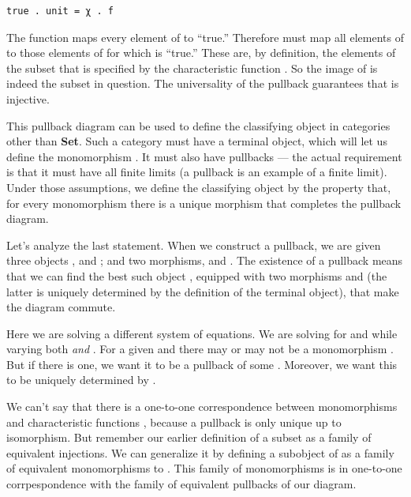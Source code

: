 \begin{Verbatim}[commandchars=\\\{\}]
true . unit = χ . f
\end{Verbatim}

The function  maps every element of  to
``true.'' Therefore  must map all elements of  to
those elements of  for which  is ``true.'' These
are, by definition, the elements of the subset that is specified by the
characteristic function . So the image of  is indeed
the subset in question. The universality of the pullback guarantees that
 is injective.

This pullback diagram can be used to define the classifying object in
categories other than \textbf{Set}. Such a category must have a terminal
object, which will let us define the monomorphism . It must
also have pullbacks --- the actual requirement is that it must have all
finite limits (a pullback is an example of a finite limit). Under those
assumptions, we define the classifying object  by the property
that, for every monomorphism  there is a unique morphism
 that completes the pullback diagram.

Let's analyze the last statement. When we construct a pullback, we are
given three objects ,  and ; and two
morphisms,  and . The existence of a pullback
means that we can find the best such object , equipped with
two morphisms  and  (the latter is uniquely
determined by the definition of the terminal object), that make the
diagram commute.

Here we are solving a different system of equations. We are solving for
 and  while varying both  \emph{and}
. For a given  and  there may or may not
be a monomorphism . But if there is one, we
want it to be a pullback of some . Moreover, we want this
 to be uniquely determined by .

We can't say that there is a one-to-one correspondence between
monomorphisms  and characteristic functions ,
because a pullback is only unique up to isomorphism. But remember our
earlier definition of a subset as a family of equivalent injections. We
can generalize it by defining a subobject of  as a family of
equivalent monomorphisms to . This family of monomorphisms is
in one-to-one corrpespondence with the family of equivalent pullbacks of
our diagram.

